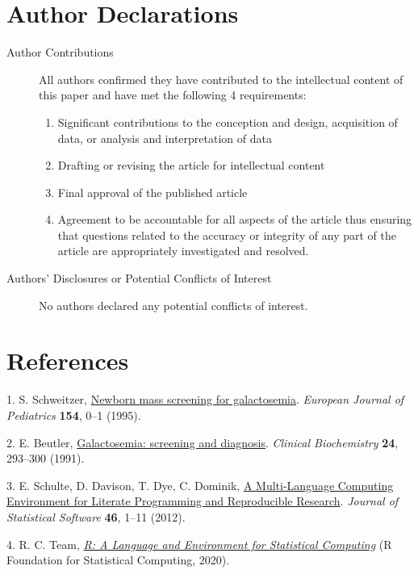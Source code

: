 \documentclass[review]{elsarticle}
\begin{document}
\section*{Author Declarations}
\label{sec:org24ca095}
\begin{description}
\item[{Author Contributions}] All authors confirmed they have contributed
to the intellectual content of this paper and have met the following
4 requirements:
\begin{enumerate}
\item Significant contributions to the conception and design, acquisition of data, or analysis and interpretation of data
\item Drafting or revising the article for intellectual content
\item Final approval of the published article
\item Agreement to be accountable for all aspects of the article thus
ensuring that questions related to the accuracy or integrity of
any part of the article are appropriately investigated and
resolved.
\end{enumerate}

\item[{Authors’ Disclosures or Potential Conflicts of Interest}] No authors declared any potential conflicts of interest.
\end{description}
\section*{References}
\label{sec:orga70906b}
\hypertarget{citeproc_bib_item_1}{1.  S. Schweitzer, \href{https://doi.org/10.1007/BF02143801}{Newborn mass screening for galactosemia}. \textit{European Journal of Pediatrics} \textbf{154}, 0–1 (1995).}

\hypertarget{citeproc_bib_item_2}{2.  E. Beutler, \href{https://doi.org/10.1016/0009-9120(91)80003-L}{Galactosemia: screening and diagnosis}. \textit{Clinical Biochemistry} \textbf{24}, 293–300 (1991).}

\hypertarget{citeproc_bib_item_3}{3.  E. Schulte, D. Davison, T. Dye, C. Dominik, \href{https://doi.org/10.18637/jss.v046.i03}{A Multi-Language Computing Environment for Literate Programming and Reproducible Research}. \textit{Journal of Statistical Software} \textbf{46}, 1–11 (2012).}

\hypertarget{citeproc_bib_item_4}{4.  R. C. Team, \textit{\href{https://www.R-project.org/}{R: A Language and Environment for Statistical Computing}} (R Foundation for Statistical Computing, 2020).}
\end{document}
